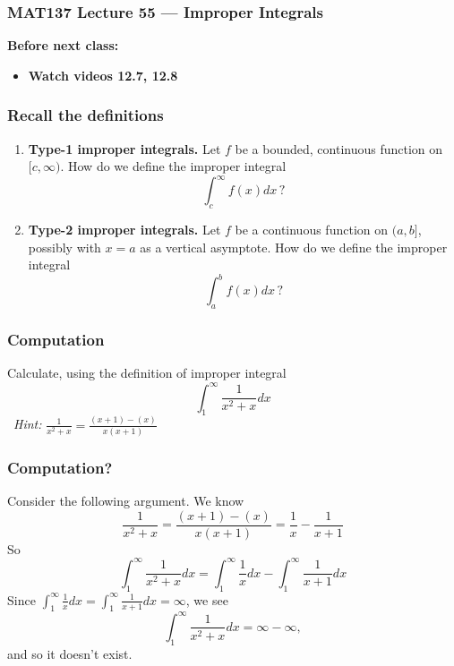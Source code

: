 \documentclass[14pt]{beamer}
\date{}
\title{}
\author{}
\begin{document}
\begin{frame}
	\frametitle{MAT137 Lecture 55 --- Improper Integrals}

	\vfill
	{\bf Before next class:}
		\begin{itemize} \normalsize
			\item {\bf Watch videos 12.7, 12.8 }
		\end{itemize}
\end{frame}
	\begin{frame}[t]
		\frametitle{Recall the definitions}

		\begin{enumerate}
			\item {\bf Type-1 improper integrals.} Let $f$ be a bounded, continuous
				function on ${\displaystyle [c, \infty)}$. How do we define the improper
				integral
				\[
					\int_{c}^{\infty}f(x) dx \, ?
				\]

				\vfill

			\item {\bf Type-2 improper integrals.} Let $f$ be a continuous function on
				${\displaystyle (a,b]}$, possibly with $x=a$ as a vertical asymptote. How
				do we define the improper integral
				\[
					\int_{a}^{b}f(x) dx \, ?
				\]

				\vfill
		\end{enumerate}
	\end{frame}
	\begin{frame}[t]
		\frametitle{Computation}

		Calculate, using the definition of improper integral
		\[
			\int_{1}^{\infty}\frac{1}{x^{2}+x}dx
		\]
		\
 \emph{Hint:}
		${\displaystyle \frac{1}{x^{2}+x} = \frac{(x+1) - (x)}{x(x+1)}}$
	\end{frame}
	\begin{frame}[t]
		\frametitle{Computation?}
		Consider the following argument.
		We know 
		\[\displaystyle \frac{1}{x^{2}+x} = \frac{(x+1) - (x)}{x(x+1)}=\frac{1}{x}-\frac{1}{x+1}\]
		So
		\[
			\int_{1}^{\infty}\frac{1}{x^{2}+x}dx=
			\int_{1}^{\infty}\frac{1}{x}dx-\int_{1}^{\infty}\frac{1}{x+1}dx
		\]
		Since $\int_{1}^{\infty}\frac{1}{x}dx=\int_{1}^{\infty}\frac{1}{x+1}dx=\infty$, we see
		\[
			\int_{1}^{\infty}\frac{1}{x^{2}+x}dx=\infty-\infty,
		\]
		 and so it doesn't exist.

	\end{frame}
\end{document}
